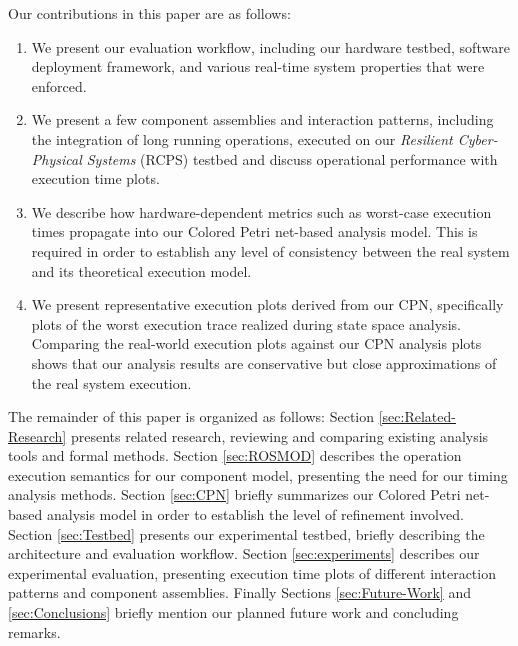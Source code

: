 Our contributions in this paper are as follows:

\begin{enumerate}
	\item We present our evaluation workflow, including our hardware testbed, software deployment framework, and various real-time system properties that were enforced.
	\item We present a few component assemblies and interaction patterns, including the integration of long running operations, executed on our \emph{Resilient Cyber-Physical Systems} (RCPS) testbed and discuss operational performance with execution time plots.
	\item We describe how hardware-dependent metrics such as worst-case execution times propagate into our Colored Petri net-based analysis model. This is required in order to establish any level of consistency between the real system and its theoretical execution model.
	\item We present representative execution plots derived from our CPN, specifically plots of the worst execution trace realized during state space analysis. Comparing the real-world execution plots against our CPN analysis plots shows that our analysis results are conservative but close approximations of the real system execution.
\end{enumerate}

The remainder of this paper is organized as follows: Section \ref{sec:Related-Research} presents related research, reviewing and comparing existing analysis tools and formal methods. Section \ref{sec:ROSMOD} describes the operation execution semantics for our component model, presenting the need for our timing analysis methods. Section \ref{sec:CPN} briefly summarizes our Colored Petri net-based analysis model in order to establish the level of refinement involved. Section \ref{sec:Testbed} presents our experimental testbed, briefly describing the architecture and evaluation workflow.  Section \ref{sec:experiments} describes our experimental evaluation, presenting execution time plots of different interaction patterns and component assemblies. Finally Sections \ref{sec:Future-Work} and \ref{sec:Conclusions} briefly mention our planned future work and concluding remarks. 


